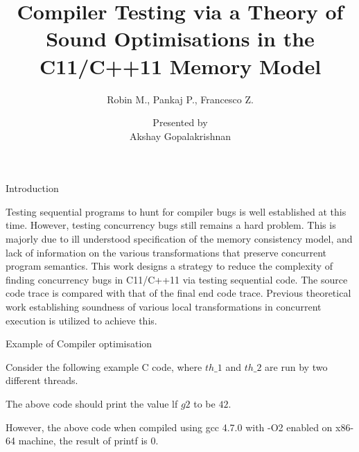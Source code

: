 \documentclass[notes, xcolor=dvipsnames]{beamer}
\title{Compiler Testing via a Theory of Sound Optimisations in the C11/C++11 Memory Model}
\subtitle{Robin M., Pankaj P., Francesco Z.}
\author{Presented by \\ Akshay Gopalakrishnan}
\begin{document}
    
    \begin{frame}
        
        \maketitle

    \end{frame}

    \begin{frame}{Introduction}

        Testing sequential programs to hunt for compiler bugs is well established at this time. 
        However, testing concurrency bugs still remains a hard problem. 
        This is majorly due to ill understood specification of the memory consistency model, and lack of information on the various transformations that preserve concurrent program semantics.
        This work designs a strategy to reduce the complexity of finding concurrency bugs in C11/C++11 via testing sequential code.
        The source code trace is compared with that of the final end code trace.
        Previous theoretical work establishing soundness of various local transformations in concurrent execution is utilized to achieve this. 
        
    \end{frame}

    \begin{frame}{Example of Compiler optimisation}

        Consider the following example C code, where $th\_1$ and $th\_2$ are run by two different threads.
        \begin{figure}
        \end{figure}

        The above code should print the value lf $g2$ to be $42$. 

        However, the above code when compiled using gcc 4.7.0 with -O2 enabled on x86-64 machine, the result of printf is $0$.  
        
    \end{frame}
\end{document}
